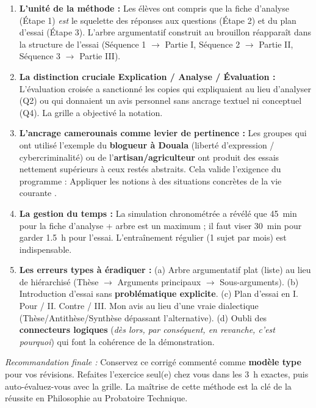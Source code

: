 \documentclass[11pt]{article}
\begin{document}
\begin{enumerate}
    \item \textbf{L'unité de la méthode :} Les élèves ont compris que la fiche d'analyse (Étape 1) \emph{est} le squelette des réponses aux questions (Étape 2) et du plan d'essai (Étape 3). L'arbre argumentatif construit au brouillon réapparaît dans la structure de l'essai (Séquence 1 $\rightarrow$ Partie I, Séquence 2 $\rightarrow$ Partie II, Séquence 3 $\rightarrow$ Partie III).
    \item \textbf{La distinction cruciale Explication / Analyse / Évaluation :} L'évaluation croisée a sanctionné les copies qui \og expliquaient \fg au lieu d'\og analyser \fg (Q2) ou qui donnaient un \og avis personnel \fg sans ancrage textuel ni conceptuel (Q4). La grille a objectivé la notation.
    \item \textbf{L'ancrage camerounais comme levier de pertinence :} Les groupes qui ont utilisé l'exemple du \textbf{blogueur à Douala} (liberté d'expression / cybercriminalité) ou de l'\textbf{artisan/agriculteur} ont produit des essais nettement supérieurs à ceux restés abstraits. Cela valide l'exigence du programme : \og Appliquer les notions à des situations concrètes de la vie courante \fg.
    \item \textbf{La gestion du temps :} La simulation chronométrée a révélé que \SI{45}{min} pour la fiche d'analyse + arbre est un maximum ; il faut viser \SI{30}{min} pour garder \SI{1,5}{h} pour l'essai. L'entraînement régulier (1 sujet par mois) est indispensable.
    \item \textbf{Les erreurs types à éradiquer :} (a) Arbre argumentatif \og plat \fg (liste) au lieu de hiérarchisé (Thèse $\rightarrow$ Arguments principaux $\rightarrow$ Sous-arguments). (b) Introduction d'essai sans \textbf{problématique explicite}. (c) Plan d'essai en \og I. Pour / II. Contre / III. Mon avis \fg au lieu d'une vraie dialectique (Thèse/Antithèse/Synthèse dépassant l'alternative). (d) Oubli des \textbf{connecteurs logiques} (\textit{dès lors, par conséquent, en revanche, c'est pourquoi}) qui font la cohérence de la démonstration.
\end{enumerate}

\emph{Recommandation finale :} Conservez ce corrigé commenté comme \textbf{modèle type} pour vos révisions. Refaites l'exercice seul(e) chez vous dans les \SI{3}{h} exactes, puis auto-évaluez-vous avec la grille. La maîtrise de cette méthode est la clé de la réussite en Philosophie au Probatoire Technique.
\end{document}
